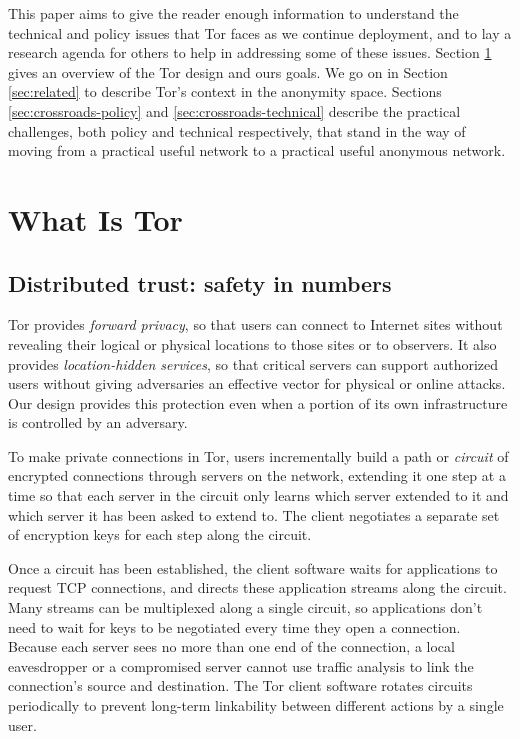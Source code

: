 \documentclass{llncs}
\begin{document}

This paper aims to give the reader enough information to understand the
technical and policy issues that Tor faces as we continue deployment,
and to lay a research agenda for others to help in addressing some of
these issues. Section \ref{sec:what-is-tor} gives an overview of the Tor
design and ours goals. We go on in Section \ref{sec:related} to describe
Tor's context in the anonymity space. Sections \ref{sec:crossroads-policy}
and \ref{sec:crossroads-technical} describe the practical challenges,
both policy and technical respectively, that stand in the way of moving
from a practical useful network to a practical useful anonymous network.

\section{What Is Tor}
\label{sec:what-is-tor}

\subsection{Distributed trust: safety in numbers}

Tor provides \emph{forward privacy}, so that users can connect to
Internet sites without revealing their logical or physical locations
to those sites or to observers.  It also provides \emph{location-hidden
services}, so that critical servers can support authorized users without
giving adversaries an effective vector for physical or online attacks.
Our design provides this protection even when a portion of its own
infrastructure is controlled by an adversary.

To make private connections in Tor, users incrementally build a path or
\emph{circuit} of encrypted connections through servers on the network,
extending it one step at a time so that each server in the circuit only
learns which server extended to it and which server it has been asked
to extend to.  The client negotiates a separate set of encryption keys
for each step along the circuit.

Once a circuit has been established, the client software waits for
applications to request TCP connections, and directs these application
streams along the circuit.  Many streams can be multiplexed along a single
circuit, so applications don't need to wait for keys to be negotiated
every time they open a connection.  Because each server sees no
more than one end of the connection, a local eavesdropper or a compromised
server cannot use traffic analysis to link the connection's source and
destination.  The Tor client software rotates circuits periodically
to prevent long-term linkability between different actions by a
single user.
\end{document}
